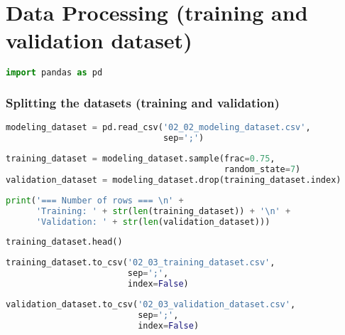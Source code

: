
\label{ape:data_processing_training_validation_dataset}
\hypertarget{data-processing-training-and-validation-dataset}{%
\section{Data Processing (training and validation
dataset)}\label{data-processing-training-and-validation-dataset}}

\begin{lstlisting}[language=Python]
import pandas as pd
\end{lstlisting}

\hypertarget{splitting-the-datasets-training-and-validation}{%
\subsubsection{Splitting the datasets (training and
validation)}\label{splitting-the-datasets-training-and-validation}}

\begin{lstlisting}[language=Python]
modeling_dataset = pd.read_csv('02_02_modeling_dataset.csv',
                               sep=';')
\end{lstlisting}

\begin{lstlisting}[language=Python]
training_dataset = modeling_dataset.sample(frac=0.75,
                                           random_state=7)
validation_dataset = modeling_dataset.drop(training_dataset.index)
\end{lstlisting}

\begin{lstlisting}[language=Python]
print('=== Number of rows === \n' +
      'Training: ' + str(len(training_dataset)) + '\n' +
      'Validation: ' + str(len(validation_dataset)))
\end{lstlisting}

\begin{lstlisting}[language=Python]
training_dataset.head()
\end{lstlisting}

\begin{lstlisting}[language=Python]
training_dataset.to_csv('02_03_training_dataset.csv',
                        sep=';',
                        index=False)
\end{lstlisting}

\begin{lstlisting}[language=Python]
validation_dataset.to_csv('02_03_validation_dataset.csv',
                          sep=';',
                          index=False)
\end{lstlisting}

